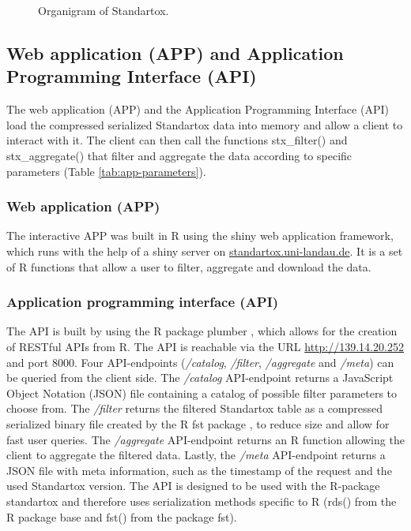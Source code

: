 \begin{figure}
    
    \caption{Organigram of Standartox.}
    \label{fig:stx-organigram}
\end{figure}

\subsection{Web application (APP) and Application Programming Interface (API)}
The web application (APP) and the Application Programming Interface (API) load the compressed serialized Standartox data into memory and allow a client to interact with it. The client can then call the functions stx\_filter() and stx\_aggregate() that filter and aggregate the data according to specific parameters (Table \ref{tab:app-parameters}).

\subsubsection{Web application (APP)}
The interactive APP was built in R using the shiny web application framework, which runs with the help of a shiny server \citep{chang_shiny_2018} on \url{standartox.uni-landau.de}. It is a set of R functions that allow a user to filter, aggregate and download the data.

\subsubsection{Application programming interface (API)}
The API is built by using the R package plumber \citep{trestletechnologyllc_plumber_2018}, which allows for the creation of RESTful APIs from R. The API is reachable via the URL \url{http://139.14.20.252} and port 8000. Four API-endpoints (\textit{/catalog}, \textit{/filter}, \textit{/aggregate} and \textit{/meta}) can be queried from the client side. The \textit{/catalog} API-endpoint returns a JavaScript Object Notation (JSON) file containing a catalog of possible filter parameters to choose from. The \textit{/filter} returns the filtered Standartox table as a compressed serialized binary file created by the R fst package \citep{klik_fst_2019}, to reduce size and allow for fast user queries. The \textit{/aggregate} API-endpoint returns an R function allowing the client to aggregate the filtered data. Lastly, the \textit{/meta} API-endpoint returns a JSON file with meta information, such as the timestamp of the request and the used Standartox version. The API is designed to be used with the R-package standartox and therefore uses serialization methods specific to R (rds() from the R package base and fst() from the package fst).

